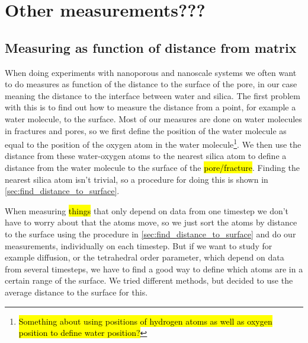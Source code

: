 \chapter{Other measurements???}

\section{Measuring as function of distance from matrix\label{sec:measuring_distance_to_matrix}}

When doing experiments with nanoporous and nanoscale systems we often want to do measures as function of the distance to the surface of the pore, in our case meaning the distance to the interface between water and silica. The first problem with this is to find out how to measure the distance from a point, for example a water molecule, to the surface. Most of our measures are done on water molecules in fractures and pores, so we first define the position of the water molecule as equal to the position of the oxygen atom in the water molecule\footnote{\hl{Something about using positions of hydrogen atoms as well as oxygen position to define water position?}}. We then use the distance from these water-oxygen atoms to the nearest silica atom to define a distance from the water molecule to the surface of the \hl{pore/fracture}. Finding the nearest silica atom isn't trivial, so a procedure for doing this is shown in \cref{sec:find_distance_to_surface}.

When measuring \hl{things} that only depend on data from one timestep we don't have to worry about that the atoms move, so we just sort the atoms by distance to the surface using the procedure in \cref{sec:find_distance_to_surface} and do our measurements, individually on each timestep. But if we want to study for example diffusion, or the tetrahedral order parameter, which depend on data from several timesteps, we have to find a good way to define which atoms are in a certain range of the surface. We tried different methods, but decided to use the average distance to the surface for this.


